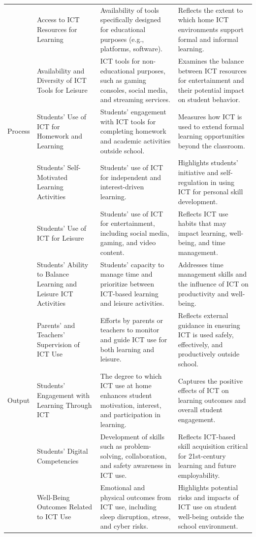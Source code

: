 \documentclass[
]{article}
\begin{document}
\begin{longtable}[t]{>{\raggedright\arraybackslash}p{1.5cm}>{\raggedright\arraybackslash}p{3.5cm}>{\raggedright\arraybackslash}p{5cm}>{\raggedright\arraybackslash}p{5cm}}
 & Access to ICT Resources for Learning & Availability of tools specifically designed for educational purposes (e.g., platforms, software). & Reflects the extent to which home ICT environments support formal and informal learning.\\
 & Availability and Diversity of ICT Tools for Leisure & ICT tools for non-educational purposes, such as gaming consoles, social media, and streaming services. & Examines the balance between ICT resources for entertainment and their potential impact on student behavior.\\
Process & Students' Use of ICT for Homework and Learning & Students’ engagement with ICT tools for completing homework and academic activities outside school. & Measures how ICT is used to extend formal learning opportunities beyond the classroom.\\
 & Students' Self-Motivated Learning Activities & Students’ use of ICT for independent and interest-driven learning. & Highlights students' initiative and self-regulation in using ICT for personal skill development.\\
\addlinespace
 & Students' Use of ICT for Leisure & Students’ use of ICT for entertainment, including social media, gaming, and video content. & Reflects ICT use habits that may impact learning, well-being, and time management.\\
 & Students’ Ability to Balance Learning and Leisure ICT Activities & Students' capacity to manage time and prioritize between ICT-based learning and leisure activities. & Addresses time management skills and the influence of ICT on productivity and well-being.\\
 & Parents' and Teachers' Supervision of ICT Use & Efforts by parents or teachers to monitor and guide ICT use for both learning and leisure. & Reflects external guidance in ensuring ICT is used safely, effectively, and productively outside school.\\
Output & Students’ Engagement with Learning Through ICT & The degree to which ICT use at home enhances student motivation, interest, and participation in learning. & Captures the positive effects of ICT on learning outcomes and overall student engagement.\\
 & Students’ Digital Competencies & Development of skills such as problem-solving, collaboration, and safety awareness in ICT use. & Reflects ICT-based skill acquisition critical for 21st-century learning and future employability.\\
\addlinespace
 & Well-Being Outcomes Related to ICT Use & Emotional and physical outcomes from ICT use, including sleep disruption, stress, and cyber risks. & Highlights potential risks and impacts of ICT use on student well-being outside the school environment.\\
\bottomrule
\end{longtable}
\end{document}
